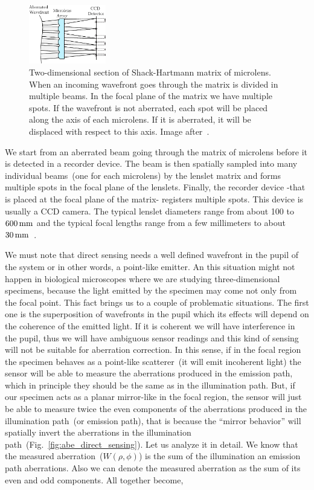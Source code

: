\begin{figure}[htbp]
	\centering
		\includegraphics[width=0.30\textwidth]{images/SH}
	\caption{Two-dimensional section of Shack-Hartmann matrix of microlens. When an incoming wavefront goes through the matrix is divided in multiple beams. In the focal plane of the matrix we have multiple spots. If the wavefront is not aberrated, each spot will be placed along the axis of each microlens. If it is aberrated, it will be displaced with respect to this axis. Image after~\cite{optical_shop_testing}.}
	\label{fig:SH}
\end{figure}


We start from an aberrated beam going through the matrix of microlens before it is detected in a recorder device. The beam is then spatially sampled into many individual beams~(one for each microlens) by the lenslet matrix and forms multiple spots in the focal plane of the lenslets. Finally, the recorder device -that is placed at the focal plane of the matrix- registers multiple spots. This device is usually a CCD camera. The typical lenslet diameters range from about 100 to $\unit[600]{mm}$ and the typical focal lengths range from a few millimeters to about $\unit[30]{mm}$~\cite{AO_vision_science}.
  
We must note that direct sensing needs a well defined wavefront in the pupil of the system or in other words, a point-like emitter. An this situation might not happen in biological microscopes where we are studying three-dimensional specimens, because the light emitted by the specimen may come not only from the focal point. This fact brings us to a couple of problematic situations. The first one is the superposition of wavefronts in the pupil which its effects will depend on the coherence of the emitted light. If it is coherent we will have interference in the pupil, thus we will have ambiguous sensor readings and this kind of sensing will not be suitable for aberration correction. In this sense, if in the focal region the specimen behaves as a point-like scatterer~(it will emit incoherent light) the sensor will be able to measure the aberrations produced in the emission path, which in principle they should be the same as in the illumination path. But, if our specimen acts as a planar mirror-like in the focal region, the sensor will just be able to measure twice the even components of the aberrations produced in the illumination path~(or emission path), that is because the "`mirror behavior"' will spatially invert the aberrations in the illumination path~(Fig.~\ref{fig:abe_direct_sensing}). Let us analyze it in detail. We know that the measured aberration~($W(\rho,\phi)$) is the sum of the illumination an emission path aberrations. Also we can denote the measured aberration as the sum of its even and odd components. All together become,  

